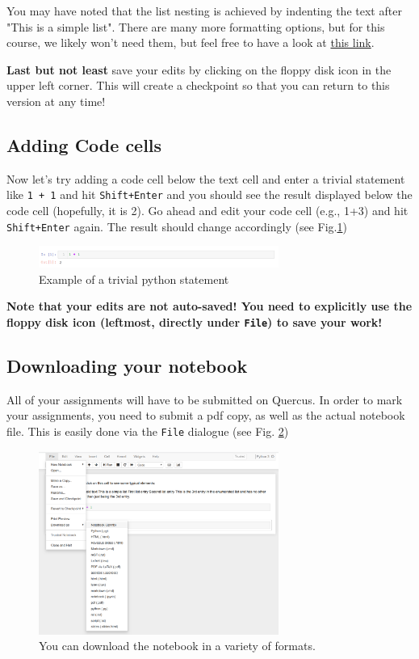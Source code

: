 \documentclass[svgnames, 11pt, lettersize]{article}
\begin{document}
You may have noted that the list nesting is achieved by 
indenting the text after "This is a simple list". There are many more
formatting options, but for this course, we likely won't need them,
but feel free to have a look at \href{https://guides.github.com/features/mastering-markdown/}{this link}.

\textbf{Last but not least} save your edits by clicking on the floppy disk
icon in the upper left corner. This will create a checkpoint so that
you can return to this version at any time!
\subsection{Adding Code cells}
\label{sec:org1b1b8fe}
Now let's try adding a code cell below the text cell and enter a
trivial statement like \texttt{1 + 1} and hit \texttt{Shift+Enter} and you should
see the result displayed below the code cell (hopefully, it is
2). Go ahead and edit your code cell (e.g., 1+3) and hit \texttt{Shift+Enter}
again. The result should change accordingly (see Fig.\ref{codesnap})
\begin{figure}[htbp]
\centering
\includegraphics[width=0.7\textwidth]{./figures/Screenshot_20200527_161029.png}
\caption{\label{codesnap}Example of a trivial python statement}
\end{figure}

\textbf{Note that your edits are not auto-saved! You need to explicitly use the
floppy disk icon (leftmost, directly under \texttt{File}) to save your work!}
\subsection{Downloading your notebook}
\label{sec:org7b7fa27}
All of your assignments will have to be submitted on Quercus. In order
to mark your assignments, you need to submit a pdf copy, as well as
the actual notebook file. This is easily done via the \texttt{File} dialogue
(see Fig. \ref{fdialog})
\begin{figure}[htbp]
\centering
\includegraphics[width=0.7\textwidth]{./figures/Screenshot_20200527_161555.png}
\caption{\label{fdialog}You can download the notebook in a variety of formats.}
\end{figure}
\end{document}
